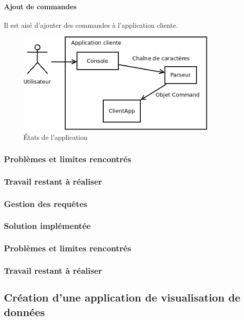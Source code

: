 \documentclass[12pt]{article}
\begin{document}
\paragraph{Ajout de commandes} Il est aisé d'ajouter des commandes à l'application cliente.

\begin{figure}[h]
	\centering
		\includegraphics[width=10cm]{images/client/command.png}
	\caption{États de l'application \label{fig:commande}}
\end{figure}



\subsubsection*{Problèmes et limites rencontrés}
\subsubsection*{Travail restant à réaliser}

\subsubsection{Gestion des requêtes}

\subsubsection*{Solution implémentée}
\subsubsection*{Problèmes et limites rencontrés}
\subsubsection*{Travail restant à réaliser}

\subsection{Création d'une application de visualisation de données}
\end{document}
